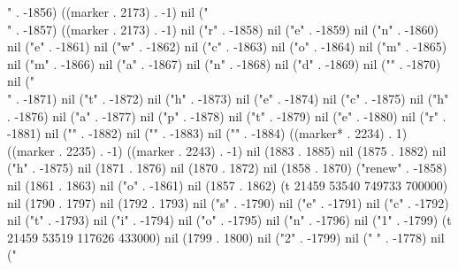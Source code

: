 " . -1856) ((marker . 2173) . -1) nil ("\\" . -1857) ((marker . 2173) . -1) nil ("r" . -1858) nil ("e" . -1859) nil ("n" . -1860) nil ("e" . -1861) nil ("w" . -1862) nil ("c" . -1863) nil ("o" . -1864) nil ("m" . -1865) nil ("m" . -1866) nil ("a" . -1867) nil ("n" . -1868) nil ("d" . -1869) nil ("{" . -1870) nil ("\\" . -1871) nil ("t" . -1872) nil ("h" . -1873) nil ("e" . -1874) nil ("c" . -1875) nil ("h" . -1876) nil ("a" . -1877) nil ("p" . -1878) nil ("t" . -1879) nil ("e" . -1880) nil ("r" . -1881) nil ("}" . -1882) nil ("{" . -1883) nil ("}" . -1884) ((marker* . 2234) . 1) ((marker . 2235) . -1) ((marker . 2243) . -1) nil (1883 . 1885) nil (1875 . 1882) nil ("h" . -1875) nil (1871 . 1876) nil (1870 . 1872) nil (1858 . 1870) ("renew" . -1858) nil (1861 . 1863) nil ("o" . -1861) nil (1857 . 1862) (t 21459 53540 749733 700000) nil (1790 . 1797) nil (1792 . 1793) nil ("s" . -1790) nil ("e" . -1791) nil ("c" . -1792) nil ("t" . -1793) nil ("i" . -1794) nil ("o" . -1795) nil ("n" . -1796) nil ("1" . -1799) (t 21459 53519 117626 433000) nil (1799 . 1800) nil ("2" . -1799) nil (" " . -1778) nil ("%